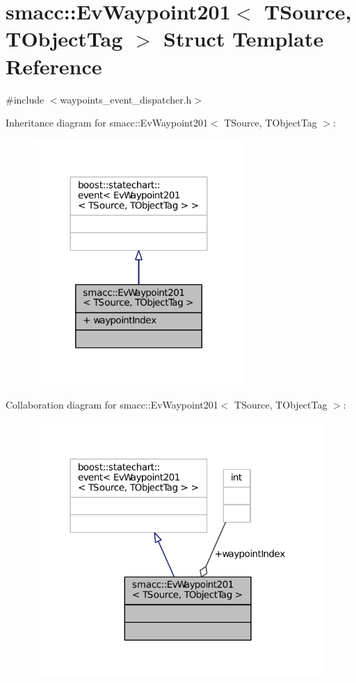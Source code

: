 \hypertarget{structsmacc_1_1EvWaypoint201}{}\section{smacc\+:\+:Ev\+Waypoint201$<$ T\+Source, T\+Object\+Tag $>$ Struct Template Reference}
\label{structsmacc_1_1EvWaypoint201}


{\ttfamily \#include $<$waypoints\+\_\+event\+\_\+dispatcher.\+h$>$}



Inheritance diagram for smacc\+:\+:Ev\+Waypoint201$<$ T\+Source, T\+Object\+Tag $>$\+:
\nopagebreak
\begin{figure}[H]
\begin{center}
\leavevmode
\includegraphics[width=227pt]{structsmacc_1_1EvWaypoint201__inherit__graph}
\end{center}
\end{figure}


Collaboration diagram for smacc\+:\+:Ev\+Waypoint201$<$ T\+Source, T\+Object\+Tag $>$\+:
\nopagebreak
\begin{figure}[H]
\begin{center}
\leavevmode
\includegraphics[width=312pt]{structsmacc_1_1EvWaypoint201__coll__graph}
\end{center}
\end{figure}
